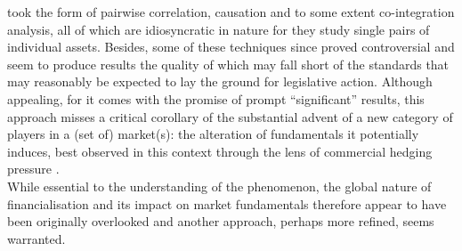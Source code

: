 \documentclass[
  authoryear,
  preprint,
  3p]{elsarticle}
\begin{document}
took the form of pairwise correlation, causation and to some extent
co-integration analysis, all of which are idiosyncratic in nature for
they study single pairs of individual assets. Besides, some of these
techniques since proved controversial and seem to produce results the
quality of which may fall short of the standards that may reasonably be
expected to lay the ground for legislative action. Although appealing,
for it comes with the promise of prompt ``significant'' results, this
approach misses a critical corollary of the substantial advent of a new
category of players in a (set of) market(s): the alteration of
fundamentals it potentially induces, best observed in this context
through the lens of commercial hedging pressure
\citep{keynes_treatise_1930, hicks_value_1939}.\\
While essential to the understanding of the phenomenon, the global
nature of financialisation and its impact on market fundamentals
therefore appear to have been originally overlooked and another
approach, perhaps more refined, seems warranted.

\medskip
\end{document}
